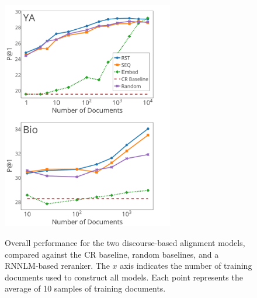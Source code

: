\begin{figure}[t!]
\begin{center}
\includegraphics[width=75mm]{graphs_test2a.pdf}
\caption{{\small Overall performance for the two discourse-based alignment models,
compared against the CR baseline, random baselines, and a RNNLM-based reranker.
The $x$ axis indicates the number of training documents used to construct all models. 
Each point represents the average of 10 samples of training documents.  }}
\vspace{-6mm}
\label{fig:performance}
\end{center}
\end{figure}

